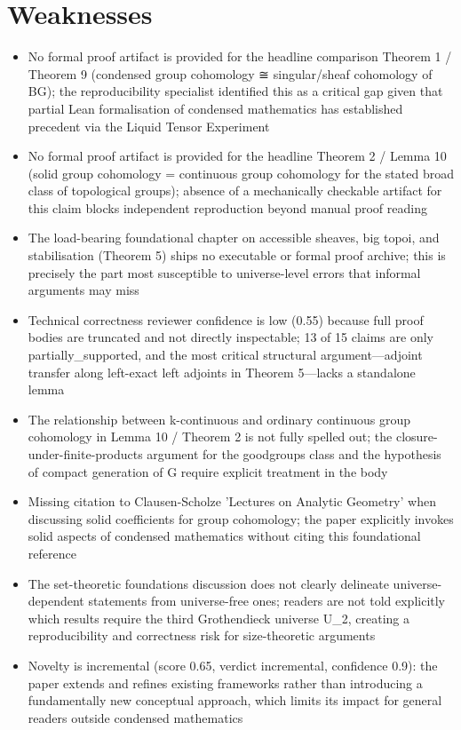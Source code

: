 \documentclass[11pt]{article}
\begin{document}
\section*{Weaknesses}
\begin{itemize}[leftmargin=*]
  \item [RECOMMENDATION GATE — critical, reproducibility] No formal proof artifact is provided for the headline comparison Theorem 1 / Theorem 9 (condensed group cohomology ≅ singular/sheaf cohomology of BG); the reproducibility specialist identified this as a critical gap given that partial Lean formalisation of condensed mathematics has established precedent via the Liquid Tensor Experiment
  \item [RECOMMENDATION GATE — critical, reproducibility] No formal proof artifact is provided for the headline Theorem 2 / Lemma 10 (solid group cohomology = continuous group cohomology for the stated broad class of topological groups); absence of a mechanically checkable artifact for this claim blocks independent reproduction beyond manual proof reading
  \item [RECOMMENDATION GATE — major, reproducibility] The load-bearing foundational chapter on accessible sheaves, big topoi, and stabilisation (Theorem 5) ships no executable or formal proof archive; this is precisely the part most susceptible to universe-level errors that informal arguments may miss
  \item Technical correctness reviewer confidence is low (0.55) because full proof bodies are truncated and not directly inspectable; 13 of 15 claims are only partially\_supported, and the most critical structural argument—adjoint transfer along left-exact left adjoints in Theorem 5—lacks a standalone lemma
  \item The relationship between k-continuous and ordinary continuous group cohomology in Lemma 10 / Theorem 2 is not fully spelled out; the closure-under-finite-products argument for the goodgroups class and the hypothesis of compact generation of G require explicit treatment in the body
  \item Missing citation to Clausen-Scholze 'Lectures on Analytic Geometry' when discussing solid coefficients for group cohomology; the paper explicitly invokes solid aspects of condensed mathematics without citing this foundational reference
  \item The set-theoretic foundations discussion does not clearly delineate universe-dependent statements from universe-free ones; readers are not told explicitly which results require the third Grothendieck universe U\_2, creating a reproducibility and correctness risk for size-theoretic arguments
  \item Novelty is incremental (score 0.65, verdict incremental, confidence 0.9): the paper extends and refines existing frameworks rather than introducing a fundamentally new conceptual approach, which limits its impact for general readers outside condensed mathematics
\end{itemize}
\end{document}
